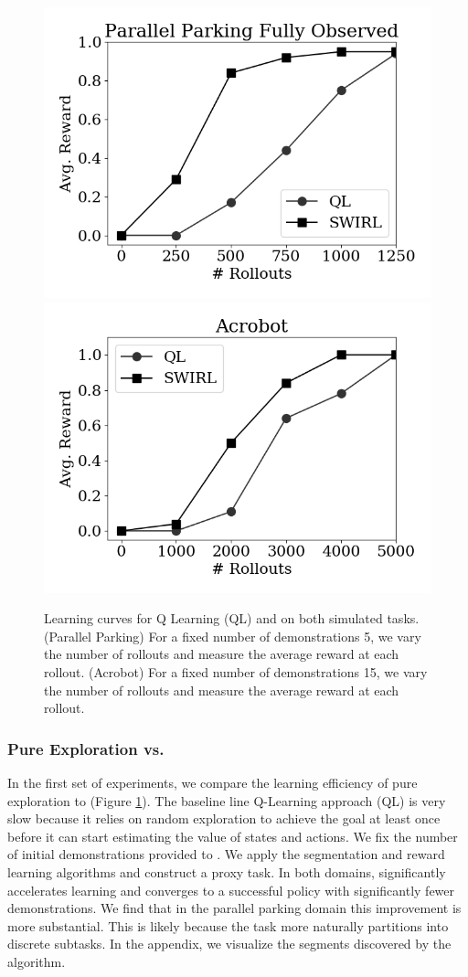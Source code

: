 \begin{figure}[t]
\centering
 \includegraphics[width=0.48\columnwidth]{swirl-experiments/ppfo-rl1.png}
 \includegraphics[width=0.48\columnwidth]{swirl-experiments/ppfo-rl2.png}
 \caption{Learning curves for Q Learning (QL) and \hirl on both simulated tasks. (Parallel Parking) For a fixed number of demonstrations 5, we vary the number of rollouts and measure the average reward at each rollout. (Acrobot) For a fixed number of demonstrations 15, we vary the number of rollouts and measure the average reward at each rollout. \label{exp:pe}}
\end{figure}

\subsubsection{Pure Exploration vs. \hirl}
In the first set of experiments, we compare the learning efficiency of pure exploration to \hirl (Figure \ref{exp:pe}).  The baseline line Q-Learning approach (QL) is very slow because it relies on random exploration to achieve the goal at least once  before  it  can  start  estimating  the  value  of  states  and actions. We fix the number of initial demonstrations provided to \hirl. We apply the segmentation and reward learning algorithms and construct a proxy task. In both domains, \hirl significantly accelerates learning and converges to a successful policy with significantly fewer demonstrations. We find that in the parallel parking domain this improvement is more substantial. This is likely because the task more naturally partitions into discrete subtasks. In the appendix, we visualize the segments discovered by the algorithm.

